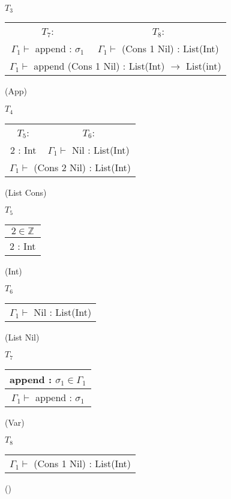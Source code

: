 \documentclass[12pt, a4paper]{article}
\begin{document}
\begin{enumerate}[(a)]
	$T_3$
	\begin{tabular}{c c}
		$T_7$: & $T_8$:\\
		$\Gamma_1 \vdash$ append : $\sigma_1$ & $\Gamma_1 \vdash$ (Cons 1 Nil) : List(Int)
		\\\hline
		\multicolumn{2}{c}{$\Gamma_1 \vdash$ append (Cons 1 Nil) : List(Int) $\rightarrow$ List(int)}
	\end{tabular}
	(App)

	$T_4$
	\begin{tabular}{c c}
		$T_5$: & $T_6$:\\
		2 : Int & $\Gamma_1 \vdash$ Nil : List(Int)
		\\\hline
		\multicolumn{2}{c}{$\Gamma_1 \vdash$ (Cons 2 Nil) : List(Int)}
	\end{tabular}
	(List Cons)

	$T_5$
	\begin{tabular}{c}
		$2 \in \mathbb{Z}$
		\\\hline
		2 : Int
	\end{tabular}
	(Int)

	$T_6$
	\begin{tabular}{c}
		\\\hline
		$\Gamma_1 \vdash$ Nil : List(Int)
	\end{tabular}
	(List Nil)

	$T_7$
	\begin{tabular}{c}
		append : $\sigma_1 \in \Gamma_1$
		\\\hline
		$\Gamma_1 \vdash$ append : $\sigma_1$
	\end{tabular}
	(Var)

	$T_8$
	\begin{tabular}{c}
		\\\hline
		$\Gamma_1 \vdash$ (Cons 1 Nil) : List(Int)
	\end{tabular}
	()
\end{enumerate}

\section{} %
\end{document}
